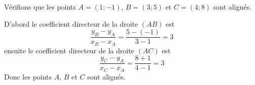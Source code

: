 \begin{example}
    Vérifions que les points \( A=(1;-1)\), \( B=(3;5)\) et \( C=(4;8)\) sont alignés.

    D'abord le coefficient directeur de la droite \( (AB)\) est 
    \begin{equation}
        \frac{ y_B-y_A }{ x_B-x_A }=\frac{ 5-(-1) }{ 3-1 }=3
    \end{equation}
    ensuite le coefficient directeur de la droite \( (AC)\) est
    \begin{equation}
        \frac{ y_C-y_A }{ x_C-x_A }=\frac{ 8+1 }{ 4-1 }=3
    \end{equation}
    Donc les points \( A\), \( B\) et \( C\) sont alignés.
\end{example}

